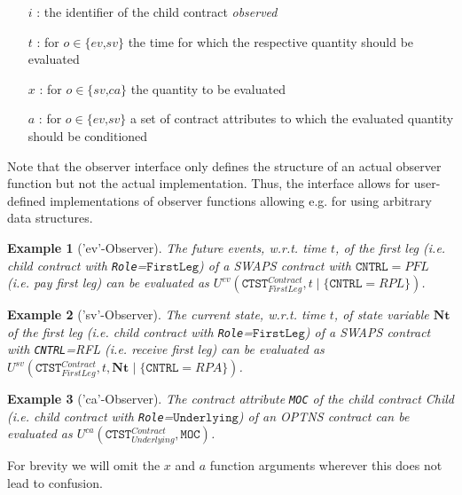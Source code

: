 \documentclass[9pt,oneside]{amsart}
\newtheorem{example}{Example}
\newcommand{\svar}[2]{\textbf{#1}_{#2}}
\newcommand{\attr}[1]{\texttt{#1}}
\newcommand{\cldev}[3]{U^{ev}(#1,#2 \mid\{#3\})}
\newcommand{\cldsv}[4]{U^{sv}(#1,#2,\svar{#3}{} \mid\{#4\})}
\newcommand{\cldca}[2]{U^{ca}(#1,#2)}
\begin{document}
\begin{multicols}{2}
\begin{itemize}
	\item[$i$]: the identifier of the child contract \textit{observed}

	\item[$t$]: for $o\in\{\textit{ev,sv}\}$ the time for which the respective quantity should be evaluated

	\item [$x$]: for $o\in\{\textit{sv,ca}\}$ the quantity to be evaluated

	\item [$a$]: for $o\in\{\textit{ev,sv}\}$ a set of contract attributes to which the evaluated quantity should be conditioned
\end{itemize}


Note that the observer interface only defines the structure of an actual observer function but not the actual implementation. Thus, the interface allows for user-defined implementations of observer functions allowing e.g. for using arbitrary data structures.

\begin{example}['ev'-Observer] The future events, w.r.t. time $t$, of the \textit{first leg} (i.e. child contract with \verb'Role'=$\texttt{FirstLeg}$) of a SWAPS contract with $\attr{CNTRL}=PFL$ (i.e. \textit{pay first leg}) can be evaluated as $\cldev{\attr{CTST}_{FirstLeg}^{Contract}}{t}{\attr{CNTRL}=RPL}$.
\end{example}

\begin{example}['sv'-Observer] The current state, w.r.t. time $t$, of state variable $\svar{Nt}{}$ of the \textit{first leg} (i.e. child contract with \verb'Role'=$\texttt{FirstLeg}$) of a SWAPS contract with \attr{CNTRL}=RFL (i.e. \textit{receive first leg}) can be evaluated as $\cldsv{\attr{CTST}_{FirstLeg}^{Contract}}{t}{Nt}{\attr{CNTRL}=RPA}$.
\end{example}

\begin{example}['ca'-Observer] The contract attribute \attr{MOC} of the child contract \textit{Child} (i.e. child contract with \verb'Role'=$\texttt{Underlying}$) of an OPTNS contract can be evaluated as $\cldca{\attr{CTST}_{Underlying}^{Contract}}{\attr{MOC}}$.
\end{example}

For brevity we will omit the $x$ and $a$ function arguments wherever this does not lead to confusion.




\end{multicols}
\end{document}
